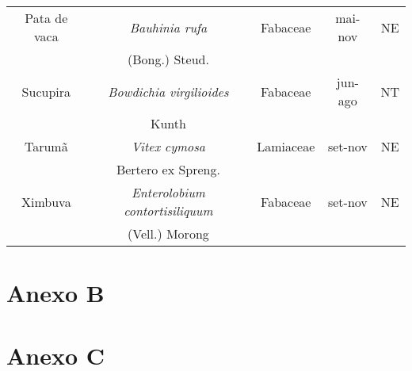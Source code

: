 \documentclass[
	12pt,				%
	oneside,			%
	a4paper,			%
	english,			%
	french,				%
	spanish,			%
	brazil				%
	]{configuracoes/tcc}
\begin{document}
\begin{anexosenv}
\begin{table}[h]
\begin{tabular}{ccccc}
			Pata de vaca 	 & \textit{Bauhinia rufa}	  				& Fabaceae 		& mai-nov 			& NE 				\\
							 &  (Bong.) Steud.							&				&				    &					\\
			
			Sucupira 		 & \textit{Bowdichia virgilioides}		  	& Fabaceae 		& jun-ago 			& NT 				\\
							 & Kunth									&				&				    &					\\
			
			Tarumã           & \textit{Vitex cymosa}	 				& Lamiaceae 	& set-nov 			& NE 				\\
							 &  Bertero ex Spreng.						& 				&					&					\\
			
			Ximbuva 		 & \textit{Enterolobium contortisiliquum}	& Fabaceae 		& set-nov 			& NE 				\\
							 &  (Vell.) Morong 							&				&					&					\\
			\hline
		\end{tabular}
	\end{table}

\chapter{Anexo B}



\chapter{Anexo C}



\end{anexosenv}

\printindex
\end{document}
